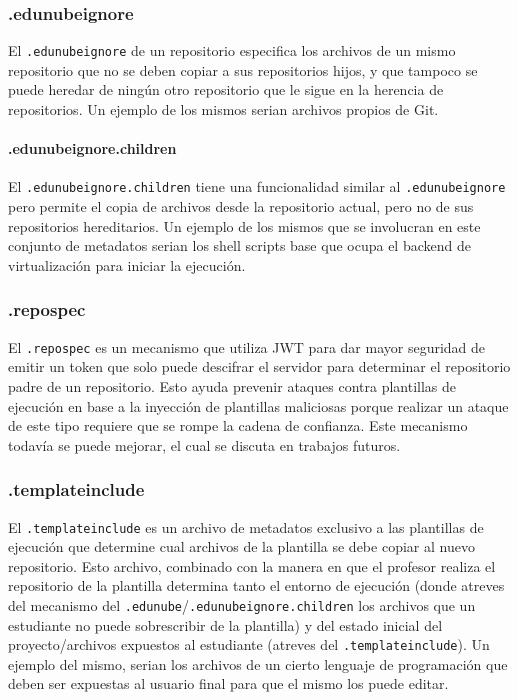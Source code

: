 \subsubsection{.edunubeignore}
El \texttt{.edunubeignore} de un repositorio especifica los archivos de un mismo repositorio que no se deben copiar a sus repositorios hijos, y que tampoco se puede heredar de ningún otro repositorio que le sigue en la herencia de repositorios. Un ejemplo de los mismos serian archivos propios de Git.
\paragraph{.edunubeignore.children}
El \texttt{.edunubeignore.children} tiene una funcionalidad similar al \texttt{.edunubeignore} pero permite el copia de archivos desde la repositorio actual, pero no de sus repositorios hereditarios. Un ejemplo de los mismos que se involucran en este conjunto de metadatos serian los shell scripts base que ocupa el backend de virtualización para iniciar la ejecución.
\subsubsection{.repospec}
El \texttt{.repospec} es un mecanismo que utiliza JWT para dar mayor seguridad de emitir un token que solo puede descifrar el servidor para determinar el repositorio padre de un repositorio. Esto ayuda prevenir ataques contra plantillas de ejecución en base a la inyección de plantillas maliciosas porque realizar un ataque de este tipo requiere que se rompe la cadena de confianza. Este mecanismo todavía se puede mejorar, el cual se discuta en trabajos futuros.
\subsubsection{.templateinclude}
El \texttt{.templateinclude} es un archivo de metadatos exclusivo a las plantillas de ejecución que determine cual archivos de la plantilla se debe copiar al nuevo repositorio. Esto archivo, combinado con la manera en que el profesor realiza el repositorio de la plantilla determina tanto el entorno de ejecución (donde atreves del mecanismo del \texttt{.edunube}/\texttt{.edunubeignore.children} los archivos que un estudiante no puede sobrescribir de la plantilla) y del estado inicial del proyecto/archivos expuestos al estudiante (atreves del \texttt{.templateinclude}). Un ejemplo del mismo, serian los archivos de un cierto lenguaje de programación que deben ser expuestas al usuario final para que el mismo los puede editar.

